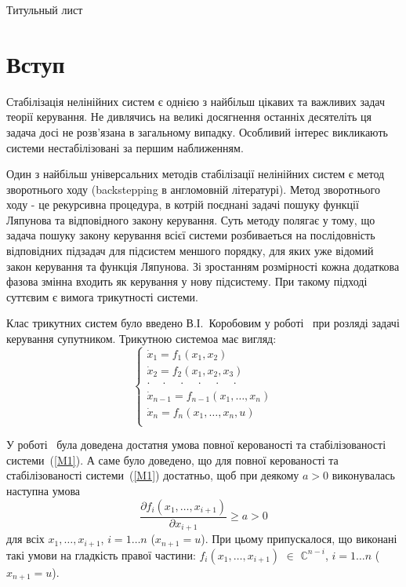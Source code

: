 \documentclass{article}
\begin{document}
Титульный лист
\pagebreak
\tableofcontents
\pagebreak

\section{Вступ}

Стабілізація нелінійних систем є однією з найбільш цікавих та важливих задач теорії керування.
Не дивлячись на великі досягнення останніх десятеліть ця задача досі не розв'язана в 
загальному випадку. Особливий інтерес викликають системи нестабілізовані за першим
наближенням. 

Один з найбільш універсальних методів стабілізації нелінійних систем є метод зворотнього ходу 
(backstepping в англомовній літературі). Метод зворотнього ходу - це рекурсивна процедура, в котрій поєднані задачі пошуку функції Ляпунова та відповідного закону
керування. Суть методу полягає у тому, що задача пошуку закону керування всієї системи розбиваеться на послідовність
відповідних підзадач для підсистем меншого порядку, для яких уже відомий закон керування та функція Ляпунова.
Зі зростанням розмірності кожна додаткова фазова змінна входить як керування у нову підсистему. 
При такому підході суттєвим є вимога трикутності системи.

Клас трикутних систем було введено В.І.~Коробовим у роботі~\cite{?} при розляді задачі
керування супутником.
Трикутною системоа має вигляд: 
\begin{equation}\label{M1}
	\begin{cases}
        \dot x_1 = f_1(x_1, x_2)\\
        \dot x_2 = f_2(x_1, x_2 ,x_3)\\
        \cdot \quad \cdot \quad \cdot \quad \cdot \quad \cdot \quad \cdot \quad\\
        \dot x_{n-1} = f_{n-1}(x_1, \dots ,x_n)\\
        \dot x_{n} = f_{n}(x_1, \dots ,x_n,u)\\
	\end{cases}
\end{equation}

У роботі~\cite{?} була доведена достатня умова повної керованості та стабілізованості
системи~(\ref{M1}). А саме було доведено, що для повної керованості та стабілізованості
системи~(\ref{M1}) достатньо, щоб при деякому $a>0$ виконувалась наступна
умова 
\begin{equation}\label{M2}
    \frac{\partial f_i(x_1,\dots,x_{i+1})}{\partial x_{i+1}} \geq a > 0 
\end{equation} 
для всіх $x_1, \dots, x_{i+1}$, $i=1 \dots n $ ($x_{n+1} = u$). При цьому 
припускалося, що виконані такі умови на гладкість правої частини: 
$ f_i(x_1,\dots,x_{i+1})$ $\in$ $\mathbb{C}^{n-i}$, $i=1 \dots n $ ($x_{n+1} = u$).
\end{document}
